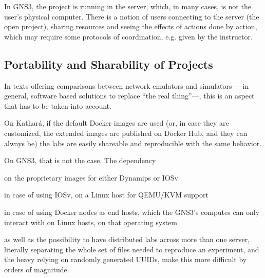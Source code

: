 

In GNS3, the project is running in the server, which, in many cases, is not the user's physical computer.
There is a notion of users connecting to the server (the open project), sharing resources and seeing the effects of actions done by action, which may require some protocols of coordination, e.g. given by the instructor.

\subsection{Portability and Sharability of Projects}
\label{subsec:comparativeportability}
In texts offering comparisons between network emulators and simulators~\cite{netkit-full,reproduciblenetexp}---in general, software based solutions to replace ``the real thing''---, this is an aspect that has to be taken into account.

On Kathará, if the default Docker images are used (or, in case they are customized, the extended images are published on Docker Hub, and they can always be) the labs are easily shareable and reproducible with the same behavior.

On GNS3, that is not the case.
The dependency
  \begin{enumerate*}[label=(\roman*), itemjoin={{, }}, itemjoin*={{, and }}]
  \item on the proprietary images for either Dynamips or IOSv
  \item in case of using IOSv, on a Linux host for QEMU/KVM support
  \item in case of using Docker nodes as end hosts, which the GNS3's computes can only interact with on Linux hosts, on that operating system
  \end{enumerate*}
as well as the possibility to have distributed labs across more than one server, literally separating the whole set of files needed to reproduce an experiment, and the heavy relying on randomly generated UUIDs, make this more difficult by orders of magnitude. %

